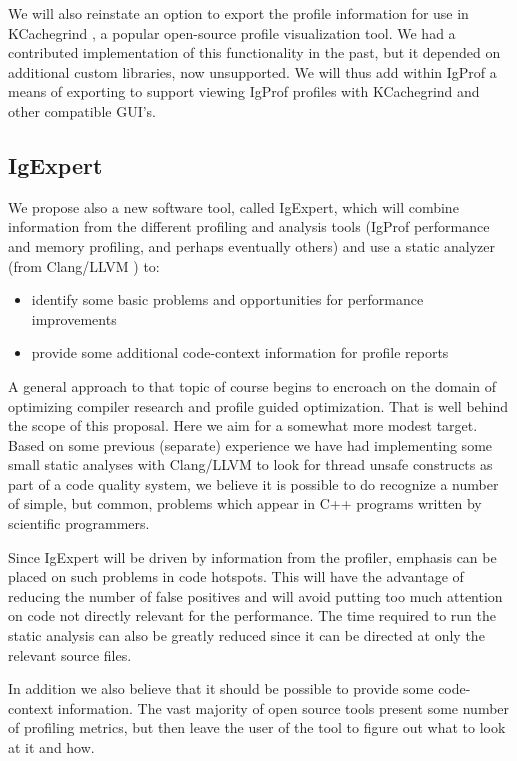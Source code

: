 \documentclass[notitlepage,letter,12pt]{article}
\begin{document}
We will also reinstate an option to export the profile information for
use in KCachegrind \cite{CACHEGRIND,KCACHEGRIND}, a popular open-source
profile visualization tool. We had a contributed implementation of this 
functionality in the past, but it depended on additional custom libraries, 
now unsupported. We will thus add within IgProf a means of exporting to
support viewing IgProf profiles with KCachegrind and other compatible GUI's.

\subsection{IgExpert}

  We propose also a new software tool, called IgExpert, which will combine 
information from the different profiling and analysis tools (IgProf performance
and memory profiling, and perhaps eventually others) and use a static
analyzer (from Clang/LLVM \cite{CLANGLLVMSTAT}) to:

\begin{itemize}
\item identify some basic problems and opportunities for performance improvements 
\item provide some additional code-context information for profile reports 
\end{itemize}

A general approach to that topic of course begins to encroach on the domain of
optimizing compiler research and profile guided optimization. That is well
behind the scope of this proposal. Here we aim for a somewhat more modest
target. Based on some previous (separate) experience we have had implementing
some small static analyses with Clang/LLVM to look for thread unsafe
constructs as part of a code quality system, we believe it is
possible to do recognize a number of simple, but common, problems which 
appear in C++ programs written by scientific programmers. 

Since IgExpert will be driven by information from the profiler, emphasis
can be placed on such problems in code hotspots. This will have the
advantage of reducing the number of false positives and will avoid
putting too much attention on code not directly relevant for the performance.
The time required to run the static analysis can also be greatly
reduced since it can be directed at only the relevant source files.

  In addition we also believe that it should be possible to provide
some code-context information. The vast majority of open source tools
present some number of profiling metrics, but then leave the user of the tool
to figure out what to look at it and how.
\end{document}
